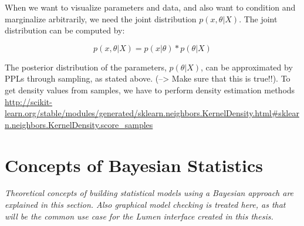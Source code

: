 \documentclass{article}
\begin{document}
When we want to visualize parameters and data, and also want to condition and marginalize arbitrarily, we need the joint distribution $p(x,\theta|X)$. The joint distribution can be computed by:

\begin{equation}
p(x,\theta|X) = p(x|\theta) * p(\theta|X)
\end{equation}

The posterior distribution of the parameters, $p(\theta|X)$, can be approximated by PPLs through sampling, as stated above. (--> Make sure that this is true!!). To get density values from samples, we have to perform density estimation methods \url{http://scikit-learn.org/stable/modules/generated/sklearn.neighbors.KernelDensity.html#sklearn.neighbors.KernelDensity.score_samples}

\section{Concepts of Bayesian Statistics}

\textit{Theoretical concepts of building statistical models using a Bayesian approach are explained in this section. Also graphical model checking is treated here, as that will be the common use case for the Lumen interface created in this thesis.}
\\
\\
%
\end{document}
